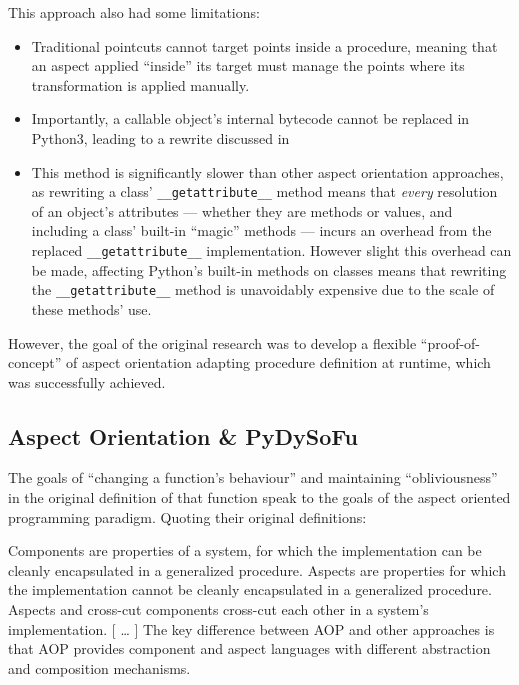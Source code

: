 This approach also had some limitations:

\begin{itemize}
    \item Traditional pointcuts cannot target points inside a procedure, meaning
    that an aspect applied ``inside'' its target must manage the points where
    its transformation is applied manually.
    \item Importantly, a callable object's internal bytecode cannot be replaced
    in Python3, leading to a rewrite discussed in 
    \item This method is significantly slower than other aspect orientation
    approaches, as rewriting a class' \lstinline{__getattribute__} method means
    that \emph{every} resolution of an object's attributes --- whether they are
    methods or values, and including a class' built-in ``magic'' methods ---
    incurs an overhead from the replaced \lstinline{__getattribute__}
    implementation. However slight this overhead can be made, affecting Python's
    built-in methods on classes means that rewriting the
    \lstinline{__getattribute__} method is unavoidably expensive due to the
    scale of these methods' use.
\end{itemize}

However, the goal of the original research was to develop a flexible
``proof-of-concept'' of aspect orientation adapting procedure definition at
runtime, which was successfully
achieved\cite{wallis2018caise,wallis2018genetic}. 

\subsection{Aspect Orientation \& PyDySoFu}\label{subsec:pdsf_aop}

The goals of ``changing a function's behaviour'' and maintaining
``obliviousness'' in the original definition of that function speak to the goals
of the aspect oriented programming paradigm\cite{kiczales1997aspect}. Quoting
their original definitions:

\begin{displayquote}
    Components are properties of a system, for which the implementation can be
    cleanly encapsulated in a generalized procedure. Aspects are properties
    for which the implementation cannot be cleanly encapsulated in a
    generalized procedure. Aspects and cross-cut components cross-cut each other
    in a system’s implementation.
    [ \ldots{} ]
    The key difference between
    AOP and other approaches is that AOP provides component and aspect languages
    with different abstraction and composition mechanisms.
\end{displayquote}

